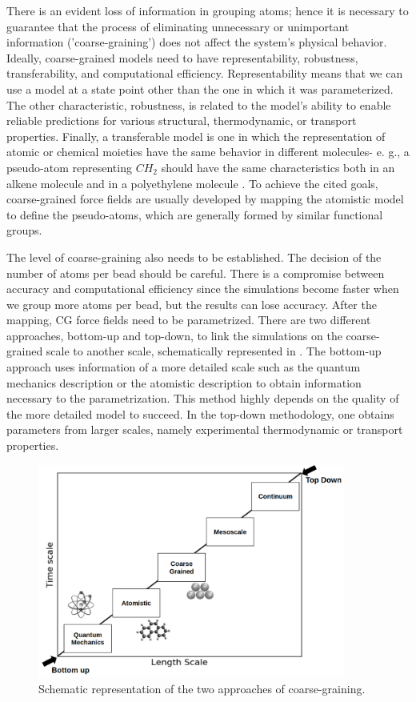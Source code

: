 There is an evident loss of information in grouping atoms; hence it is necessary to guarantee that the process of eliminating unnecessary or unimportant information ('coarse-graining') does not affect the system's physical behavior. Ideally, coarse-grained models need to have representability, robustness, transferability, and computational efficiency. Representability means that we can use a model at a state point other than the one in which it was parameterized. The other characteristic, robustness, is related to the model's ability to enable reliable predictions for various structural, thermodynamic, or transport properties. Finally, a transferable model is one in which the representation of atomic or chemical moieties have the same behavior in different molecules- e. g., a pseudo-atom representing $CH_{2}$ should have the same characteristics both in an alkene molecule and in a polyethylene molecule     \cite{doi:10.1146/annurev-chembioeng-061312-103314}. To achieve the cited goals, coarse-grained force fields are usually developed by mapping the atomistic model to define the pseudo-atoms, which are generally formed by similar functional groups. 

The level of coarse-graining also needs to be established. The decision of the number of atoms per bead should be careful. There is a compromise between accuracy and computational efficiency since the simulations become faster when we group more atoms per bead, but the results can lose accuracy. After the mapping, CG force fields need to be parametrized. There are two different approaches, bottom-up and top-down, to link the simulations on the coarse-grained scale to another scale, schematically represented in . The bottom-up approach uses information of a more detailed scale such as the quantum mechanics description or the atomistic description to obtain information necessary to the parametrization. This method highly depends on the quality of the more detailed model to succeed. In the top-down methodology, one obtains parameters from larger scales, namely experimental thermodynamic or transport properties. 

\begin{figure}[H]
	\raggedleft
	\includegraphics[width=0.9\textwidth]{Figures/multiscale}
	\caption{Schematic representation of the two approaches of coarse-graining.}
	\label{fig:multiscale}
\end{figure}
\FloatBarrier


